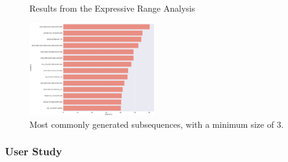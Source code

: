 \begin{figure}[t]
\begin{subfigure}[t]{0.9\textwidth}
    \end{subfigure}
    \caption{Results from the Expressive Range Analysis}
    \label{figs:Experiments}
\end{figure}

\begin{figure}[]
    \centering
    \includegraphics[width=0.48\textwidth]{included-papers-tex/paper-8/figures/CommonSubsequence-GSP.png}
    \caption{Most commonly generated subsequences, with a minimum size of 3.}
    \label{figs:evaluation:CommonSequence}
\end{figure}



\subsubsection{User Study}



